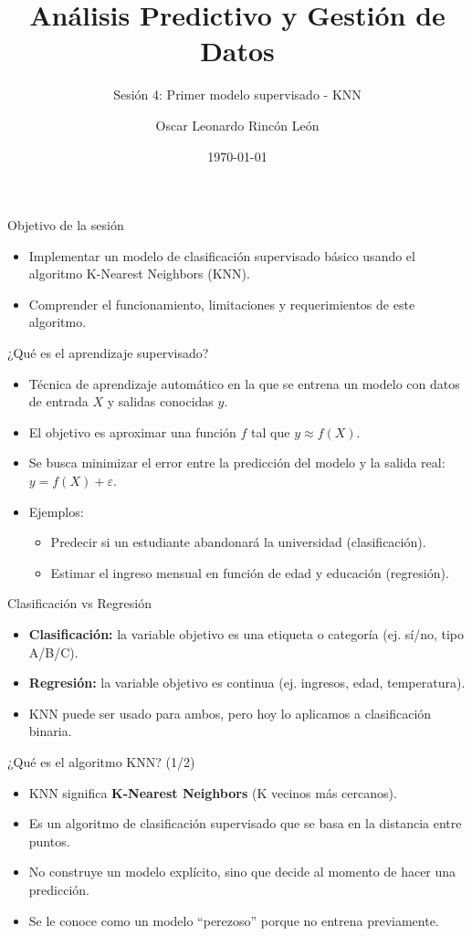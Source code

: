 \documentclass{beamer}
\title{Análisis Predictivo y Gestión de Datos}
\subtitle{Sesión 4: Primer modelo supervisado - KNN}
\author{Oscar Leonardo Rincón León}
\date{\today}
\begin{document}
\frame{\titlepage}

\begin{frame}{Objetivo de la sesión}
\begin{itemize}
    \item Implementar un modelo de clasificación supervisado básico usando el algoritmo K-Nearest Neighbors (KNN).
    \item Comprender el funcionamiento, limitaciones y requerimientos de este algoritmo.
\end{itemize}
\end{frame}

\begin{frame}{¿Qué es el aprendizaje supervisado?}
\begin{itemize}
    \item Técnica de aprendizaje automático en la que se entrena un modelo con datos de entrada $X$ y salidas conocidas $y$.
    \item El objetivo es aproximar una función $f$ tal que $y \approx f(X)$.
    \item Se busca minimizar el error entre la predicción del modelo y la salida real: $y = f(X) + \varepsilon$.
    \item Ejemplos:
    \begin{itemize}
        \item Predecir si un estudiante abandonará la universidad (clasificación).
        \item Estimar el ingreso mensual en función de edad y educación (regresión).
    \end{itemize}
\end{itemize}
\end{frame}

\begin{frame}{Clasificación vs Regresión}
\begin{itemize}
    \item \textbf{Clasificación:} la variable objetivo es una etiqueta o categoría (ej. sí/no, tipo A/B/C).
    \item \textbf{Regresión:} la variable objetivo es continua (ej. ingresos, edad, temperatura).
    \item KNN puede ser usado para ambos, pero hoy lo aplicamos a clasificación binaria.
\end{itemize}
\end{frame}


\begin{frame}{¿Qué es el algoritmo KNN? (1/2)}
\begin{itemize}
    \item KNN significa \textbf{K-Nearest Neighbors} (K vecinos más cercanos).
    \item Es un algoritmo de clasificación supervisado que se basa en la distancia entre puntos.
    \item No construye un modelo explícito, sino que decide al momento de hacer una predicción.
    \item Se le conoce como un modelo “perezoso” porque no entrena previamente.
\end{itemize}
\end{frame}
\end{document}
